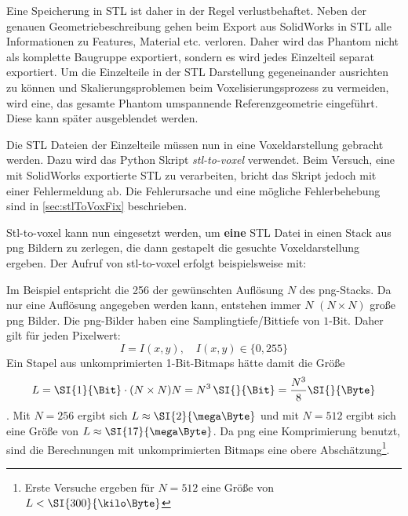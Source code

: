 Eine Speicherung in STL ist daher in der Regel verlustbehaftet. Neben der genauen Geometriebeschreibung gehen beim Export aus SolidWorks in STL alle Informationen zu Features, Material etc. verloren. Daher wird das Phantom nicht als komplette Baugruppe exportiert, sondern es wird jedes Einzelteil separat exportiert. Um die Einzelteile in der STL Darstellung gegeneinander ausrichten zu können und Skalierungsproblemen beim Voxelisierungsprozess zu vermeiden, wird eine, das gesamte Phantom umspannende Referenzgeometrie eingeführt. Diese kann später ausgeblendet werden.

Die STL Dateien der Einzelteile müssen nun in eine Voxeldarstellung gebracht werden. Dazu wird das Python Skript \textit{stl-to-voxel} \cite{stlToVox} verwendet. Beim Versuch, eine mit SolidWorks exportierte STL zu verarbeiten, bricht das Skript jedoch mit einer Fehlermeldung ab. Die Fehlerursache und eine mögliche Fehlerbehebung sind in \autoref{sec:stlToVoxFix} beschrieben.

Stl-to-voxel kann nun eingesetzt werden, um \textbf{eine} STL Datei in einen Stack aus png Bildern zu zerlegen, die dann gestapelt die gesuchte Voxeldarstellung ergeben.
Der Aufruf von stl-to-voxel erfolgt beispielsweise mit:

Im Beispiel entspricht die 256 der gewünschten Auflösung $N$ des png-Stacks. Da nur eine Auflösung angegeben werden kann, entstehen immer $N$ $(N\times N)$ große png Bilder. Die png-Bilder haben eine Samplingtiefe/Bittiefe von $1$-Bit. Daher gilt für jeden Pixelwert:
\begin{equation}
	I = I(x,y) , \quad I(x,y) \in \{0, 255\}
\end{equation}
Ein Stapel aus unkomprimierten 1-Bit-Bitmaps hätte damit die Größe
\begin{equation}
	L=\SI{1}{\Bit} \cdot (N \times N) N = N^3 \,\SI{}{\Bit} = \frac{N^3}{8} \SI{}{\Byte}
\end{equation}.
Mit $N=256$ ergibt sich $L\approx \SI{2}{\mega\Byte}$ und mit $N=512$ ergibt sich eine Größe von $L\approx \SI{17}{\mega\Byte}$. Da png eine Komprimierung benutzt, sind die Berechnungen mit unkomprimierten Bitmaps eine obere Abschätzung\footnote{Erste Versuche ergeben für $N=512$ eine Größe von $L<\SI{300}{\kilo\Byte}$}.

